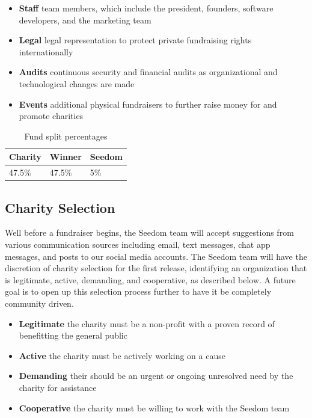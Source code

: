 \documentclass[11pt]{article}
\begin{document}
\begin{itemize}
\item{\textbf{Staff} team members, which include the president, founders, software developers, and the marketing team}
\item{\textbf{Legal} legal representation to protect private fundraising rights internationally}
\item{\textbf{Audits} continuous security and financial audits as organizational and technological changes are made}
\item{\textbf{Events} additional physical fundraisers to further raise money for and promote charities}
\end{itemize}

\begin{table}[H]
\begin{center}
\begin{tabular}{| l | l | l |}
\hline
\textbf{Charity} & \textbf{Winner} & \textbf{Seedom} \\ \hline
47.5\% & 47.5\%  & 5\% \\ \hline
\end{tabular}
\caption{Fund split percentages}
\label{tab:fundSplitPercentages}
\end{center}
\end{table}

\subsection{Charity Selection}

Well before a fundraiser begins, the Seedom team will accept suggestions from various communication sources including email, text messages, chat app messages, and posts to our social media accounts. The Seedom team will have the discretion of charity selection for the first release, identifying an organization that is legitimate, active, demanding, and cooperative, as described below. A future goal is to open up this selection process further to have it be completely community driven.

\begin{itemize}
\item{\textbf{Legitimate} the charity must be a non-profit with a proven record of benefitting the general public}
\item{\textbf{Active} the charity must be actively working on a cause}
\item{\textbf{Demanding} their should be an urgent or ongoing unresolved need by the charity for assistance}
\item{\textbf{Cooperative} the charity must be willing to work with the Seedom team}
\end{itemize}
\end{document}
